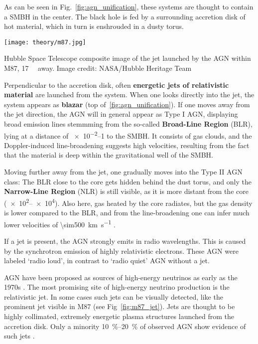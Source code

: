 As can be seen in Fig.~\ref{fig:agn_unification}, these systems are thought to contain a SMBH in the center. The black hole is fed by a surrounding accretion disk of hot material, which in turn is enshrouded in a dusty torus.



\begin{marginfigure}
    \texttt{[image: theory/m87.jpg]}
    \caption[M87 jet]{Hubble Space Telescope composite image of the jet launched by the AGN within M87, \SI{17}{\mega\parsec} away. Image credit: NASA/Hubble Heritage Team}
\end{marginfigure}
Perpendicular to the accretion disk, often \textbf{energetic jets of relativistic material} are launched from the system. When one looks directly into the jet, the system appears as \textbf{blazar} (top of~\ref{fig:agn_unification}). If one moves away from the jet direction, the AGN will in general appear as Type I AGN, displaying broad emission lines stemmming from the so-called \textbf{Broad-Line Region} (BLR), lying at a distance of \SIrange{e-2}{1}{\parsec} to the SMBH. It consists of gas clouds, and the Doppler-induced line-broadening suggests high velocities, resulting from the fact that the material is deep within the gravitational well of the SMBH.

Moving further away from the jet, one gradually moves into the Type II AGN class: The BLR close to the core gets hidden behind the dust torus, and only the  \textbf{Narrow-Line Region} (NLR) is still visible, as it is more distant from the core (\SIrange{e2}{e4}{\parsec}). Also here, gas heated by the core radiates, but the gas density is lower compared to the BLR, and from the line-broadening one can infer much lower velocities of \SI{\sim500}{\kilo\m\per\s} .

If a jet is present, the AGN strongly emits in radio wavelengths. This is caused by the synchrotron emission of highly relativistic electrons. These AGN were labeled `radio loud', in contrast to `radio quiet' AGN without a jet.

AGN have been proposed as sources of high-energy neutrinos as early as the 1970s .
The most promising site of high-energy neutrino production is the relativistic jet. In some cases such jets can be visually detected, like the prominent jet visible in M87 (see Fig~\ref{fig:m87_jet}). Jets are thought to be highly collimated, extremely energetic plasma structures launched from the accretion disk. Only a minority \SIrange{10}{20}{\percent} of observed AGN show evidence of such jets .

